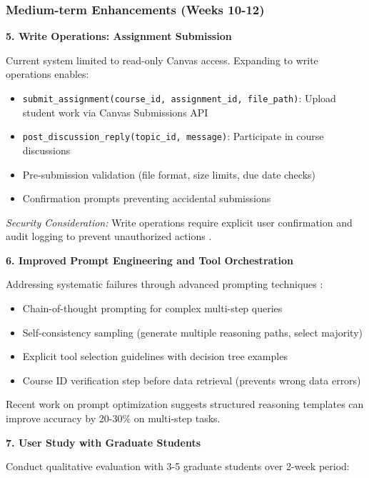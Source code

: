 \documentclass{article}
\begin{document}
\subsubsection{Medium-term Enhancements (Weeks 10-12)}

\textbf{5. Write Operations: Assignment Submission}

Current system limited to read-only Canvas access. Expanding to write operations enables:

\begin{itemize}
    \item \texttt{submit\_assignment(course\_id, assignment\_id, file\_path)}: Upload student work via Canvas Submissions API
    \item \texttt{post\_discussion\_reply(topic\_id, message)}: Participate in course discussions
    \item Pre-submission validation (file format, size limits, due date checks)
    \item Confirmation prompts preventing accidental submissions
\end{itemize}

\textit{Security Consideration:} Write operations require explicit user confirmation and audit logging to prevent unauthorized actions \cite{mcpsecurity2025}.

\textbf{6. Improved Prompt Engineering and Tool Orchestration}

Addressing systematic failures through advanced prompting techniques \cite{prompt2024engineering, chain2023thought}:

\begin{itemize}
    \item Chain-of-thought prompting for complex multi-step queries
    \item Self-consistency sampling (generate multiple reasoning paths, select majority)
    \item Explicit tool selection guidelines with decision tree examples
    \item Course ID verification step before data retrieval (prevents wrong data errors)
\end{itemize}

Recent work on prompt optimization \cite{prompt2024engineering} suggests structured reasoning templates can improve accuracy by 20-30\% on multi-step tasks.

\textbf{7. User Study with Graduate Students}

Conduct qualitative evaluation with 3-5 graduate students over 2-week period:
\end{document}
